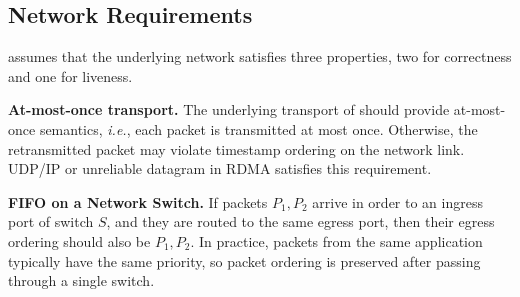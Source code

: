 





\iffalse
\subsection{Network Requirements}
\label{sec:assumptions}

\sys assumes that the underlying network satisfies three properties, two for correctness and one for liveness.

\textbf{At-most-once transport.}
The underlying transport of \sys should provide at-most-once semantics, \textit{i.e.}, each packet is transmitted at most once.
Otherwise, the retransmitted packet may violate timestamp ordering on the network link.
UDP/IP or unreliable datagram in RDMA satisfies this requirement.

\textbf{FIFO on a Network Switch.}
If packets $P_1, P_2$ arrive in order to an ingress port of switch $S$, and they are routed to the same egress port, then their egress ordering should also be $P_1, P_2$.
In practice, packets from the same application typically have the same priority, so packet ordering is preserved after passing through a single switch.

